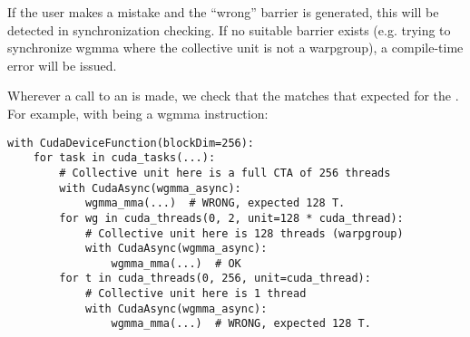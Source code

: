 \filbreak
If the user makes a mistake and the ``wrong'' barrier is generated, this will be detected in synchronization checking.
If no suitable barrier exists (e.g. trying to synchronize wgmma where the collective unit is not a warpgroup), a compile-time error will be issued.

\filbreak
{}
Wherever a call to an  is made, we check that the  matches that expected for the .
For example, with  being a wgmma instruction:
{\color{lightttColor}
\begin{verbatim}
with CudaDeviceFunction(blockDim=256):
    for task in cuda_tasks(...):
        # Collective unit here is a full CTA of 256 threads
        with CudaAsync(wgmma_async):
            wgmma_mma(...)  # WRONG, expected 128 T.
        for wg in cuda_threads(0, 2, unit=128 * cuda_thread):
            # Collective unit here is 128 threads (warpgroup)
            with CudaAsync(wgmma_async):
                wgmma_mma(...)  # OK
        for t in cuda_threads(0, 256, unit=cuda_thread):
            # Collective unit here is 1 thread
            with CudaAsync(wgmma_async):
                wgmma_mma(...)  # WRONG, expected 128 T.
\end{verbatim}
}


